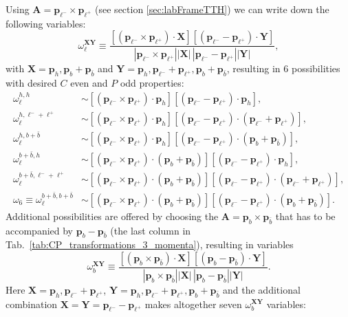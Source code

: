 \documentclass[11pt,a4paper]{article}
\newcommand{\lp}{\bm{p}_{\ell^+}}
\newcommand{\lm}{\bm{p}_{\ell^-}}
\renewcommand{\b}{\bm{p}_b}
\newcommand{\bbar}{\bm{p}_{\bar{b}}}
\newcommand{\h}{\bm{p}_h}
\begin{document}
Using $\bm{A} = \lm \times \lp$ (see section \ref{sec:labFrameTTH}) we can write down the following
variables:
\begin{equation}
  \label{eq:OmegaL}
  \omega_{\ell}^{\bm{X} \bm{Y}} \equiv \frac{\left[(\lm \times \lp) \cdot \bm{X}\right] \left[(\lm - \lp)\cdot \bm{Y}\right]}{|\lm \times \lp||\bm{X} |\,|\lm-\lp| |\bm{Y}|}, 
\end{equation}
with $\bm{X} = \h, \b+\bbar$ and $\bm{Y} = \h, \lm+\lp, \b+\bbar$,
resulting in 6 possibilities with desired $C$ even and $P$ odd properties:
\begin{align}
    \omega_{\ell}^{h,h} &\sim \left[(\lm \times \lp) \cdot \h\right] \left[(\lm - \lp)\cdot \h\right],\\
    \omega_{\ell}^{h,\ell^- +\ell^+} &\sim \left[(\lm \times \lp) \cdot \h\right] \left[(\lm - \lp)\cdot (\lm+\lp)\right],\\
    \omega_{\ell}^{h,b+\bar b} &\sim \left[(\lm \times \lp) \cdot \h\right] \left[(\lm - \lp)\cdot (\b+\bbar)\right],\\
    \omega_{\ell}^{b+\bar b, h} &\sim \left[(\lm \times \lp) \cdot (\b+\bbar)\right] \left[(\lm - \lp)\cdot \h\right],\\
    \omega_{\ell}^{b+\bar b,\ell^- + \ell^+} &\sim \left[(\lm \times \lp) \cdot (\b+\bbar)\right] \left[(\lm - \lp)\cdot (\lm+\lp)\right],\\
        \omega_6 \equiv \omega_{\ell}^{b+\bar b,b+\bar b} &\sim \left[(\lm \times \lp) \cdot (\b+\bbar)\right] \left[(\lm - \lp)\cdot (\b+\bbar)\right].
\end{align}
Additional possibilities are offered by choosing the
$\bm{A} = \b \times \bbar$ that has to be accompanied by
$\b - \bbar$ (the last column in
Tab.~\ref{tab:CP_transformations_3_momenta}), resulting in variables
\begin{equation}
    \label{eq:OmegaB}
  \omega_{b}^{\bm{X} \bm{Y}} \equiv \frac{\left[(\b \times \bbar) \cdot \bm{X}\right] \left[(\b - \bbar)\cdot \bm{Y}\right]}{|\b \times \bbar||\bm{X}|\,|\b-\bbar||\bm{Y}|}.
\end{equation}
Here $\bm{X} =\h, \lm+\lp$, $\bm{Y} =  \h, \lm+\lp, \b+\bbar$ and the additional combination $\bm{X} = \bm{Y} = \lm-\lp$ makes altogether seven $\omega_b^{\bm{X} \bm{Y}}$ variables:
\end{document}
